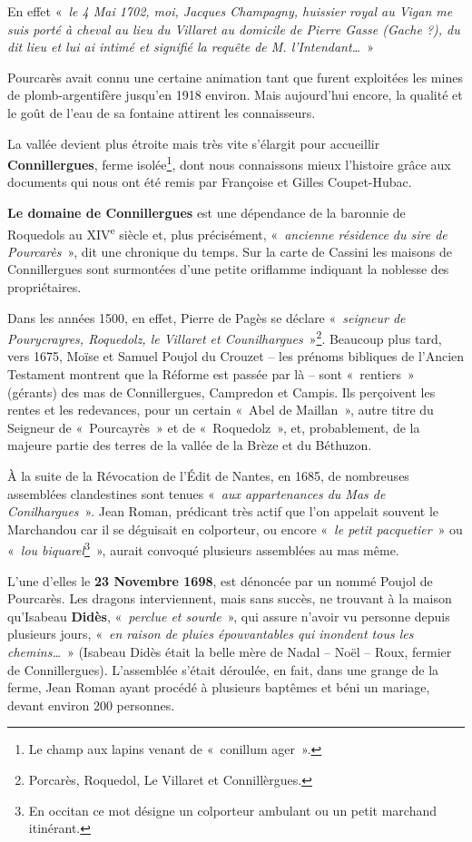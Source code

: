 En effet «~\textit{le 4 Mai 1702, moi, Jacques Champagny, huissier royal au Vigan me suis porté à
cheval au lieu du Villaret au domicile de Pierre Gasse (Gache ?), du dit lieu et lui ai intimé
et signifié la requête de M. l’Intendant…}~»

Pourcarès avait connu une certaine animation tant que furent exploitées les mines de plomb-argentifère jusqu’en 1918 environ. Mais aujourd’hui encore, la qualité et le goût de l’eau de sa
fontaine attirent les connaisseurs.

La vallée devient plus étroite mais très vite s’élargit pour accueillir \textbf{Connillergues}, ferme
isolée\footnote{Le champ aux lapins  venant de «~conillum ager~».}, dont nous connaissons mieux l’histoire grâce aux
documents qui nous ont été remis par Françoise et Gilles Coupet-Hubac.

\textbf{Le domaine de Connillergues} est une dépendance de la baronnie de Roquedols au XIV\textsuperscript{e} siècle
et, plus précisément, «~\textit{ancienne résidence du sire de Pourcarès}~», dit une chronique du temps.
Sur la carte de Cassini les maisons de Connillergues sont surmontées d’une petite oriflamme
indiquant la noblesse des propriétaires.

Dans les années 1500, en effet, Pierre de Pagès se déclare «~\textit{seigneur de Pourycrayres,
Roquedolz, le Villaret et Counilhargues}~»\footnote{Porcarès, Roquedol, Le Villaret et Connillèrgues.}. Beaucoup plus tard, vers 1675, Moïse et Samuel
Poujol du Crouzet -- les prénoms bibliques de l’Ancien Testament montrent que la Réforme
est passée par là -- sont «~rentiers~» (gérants) des mas de Connillergues, Campredon et Campis.
Ils perçoivent les rentes et les redevances, pour un certain «~Abel de Maillan~», autre titre du
Seigneur de «~Pourcayrès~» et de «~Roquedolz~», et, probablement, de la majeure partie des terres
de la vallée de la Brèze et du Béthuzon.

À la suite de la Révocation de l’Édit de Nantes, en 1685, de nombreuses assemblées
clandestines sont tenues «~\textit{aux appartenances du Mas de Conilhargues}~». Jean Roman,
prédicant très actif que l’on appelait souvent le Marchandou car il se déguisait en colporteur,
ou encore «~\textit{le petit pacquetier}~» ou «~\textit{lou biquarel}\footnote{En occitan ce mot désigne un colporteur ambulant ou un petit marchand itinérant.}~», aurait convoqué plusieurs assemblées
au mas même.

L’une d’elles le \textbf{23 Novembre 1698}, est dénoncée par un nommé Poujol de Pourcarès. Les
dragons interviennent, mais sans succès, ne trouvant à la maison qu’Isabeau \textbf{Didès}, «~\textit{perclue
et sourde}~», qui assure n’avoir vu personne depuis plusieurs jours, «~\textit{en raison de pluies
épouvantables qui inondent tous les chemins…}~» (Isabeau Didès était la belle mère de Nadal
-- Noël -- Roux, fermier de Connillergues).
L’assemblée s’était déroulée, en fait, dans une grange de la ferme, Jean Roman ayant procédé
à plusieurs baptêmes et béni un mariage, devant environ 200 personnes.

